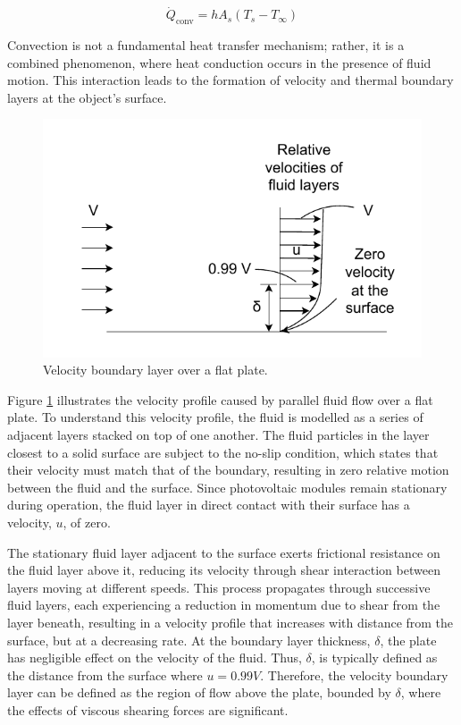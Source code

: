 \begin{equation}
    \dot{Q}_\text{conv} = hA_s(T_s-T_\infty)
    \label{eq:rate_of_convective_heat_transfer_function}
\end{equation}

Convection is not a fundamental heat transfer mechanism; rather, it is a combined phenomenon, where heat conduction occurs in the presence of fluid motion. This interaction leads to the formation of velocity and thermal boundary layers at the object's surface. \cite{Cengel2014FundamentalsConvection}

\begin{figure}[ht]
    \centering
    \includegraphics[width=0.75\linewidth]{Figures/velocity_boundary_layer.pdf}
    \caption{Velocity boundary layer over a flat plate. \cite{Cengel2014FundamentalsConvection}}
    \label{fig:velocity_boundary_layer}
\end{figure}

Figure \ref{fig:velocity_boundary_layer} illustrates the velocity profile caused by parallel fluid flow over a flat plate. To understand this velocity profile, the fluid is modelled as a series of adjacent layers stacked on top of one another. The fluid particles in the layer closest to a solid surface are subject to the no-slip condition, which states that their velocity must match that of the boundary, resulting in zero relative motion between the fluid and the surface. Since photovoltaic modules remain stationary during operation, the fluid layer in direct contact with their surface has a velocity, $u$, of zero.\vspace{0.5em}

The stationary fluid layer adjacent to the surface exerts frictional resistance on the fluid layer above it, reducing its velocity through shear interaction between layers moving at different speeds. This process propagates through successive fluid layers, each experiencing a reduction in momentum due to shear from the layer beneath, resulting in a velocity profile that increases with distance from the surface, but at a decreasing rate. At the boundary layer thickness, $\delta$, the plate has negligible effect on the velocity of the fluid. Thus, $\delta$, is typically defined as the distance from the surface where $u = 0.99V$. Therefore, the velocity boundary layer can be defined as the region of flow above the plate, bounded by $\delta$, where the effects of viscous shearing forces are significant.\vspace{0.5em}

